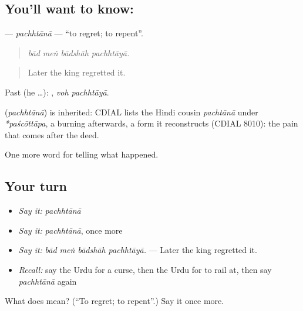 \subsection*{You'll want to know: }
\textbf{} — \emph{pachhtānā} — \textquotedblleft{}to regret; to repent\textquotedblright{}.

\begin{quote}
   
\end{quote}

\begin{quote}
\emph{bād meṅ bādshāh pachhtāyā.}
\end{quote}

\begin{quote}
Later the king regretted it.
\end{quote}

Past (he …):  , \emph{voh pachhtāyā}.

\begin{cousinweb}
\textbf{} (\emph{pachhtānā}) is inherited: CDIAL lists the Hindi cousin \emph{pachtānā} under \emph{*paścōttāpa}, a burning afterwards, a form it reconstructs (CDIAL 8010): the pain that comes after the deed.
\end{cousinweb}

\begin{grammarlens}[title={What you've built}]
One more word for telling what happened.
\end{grammarlens}

\subsection*{Your turn}
\begin{itemize}
\raggedright
  \item \emph{Say it:} \emph{pachhtānā}
  \item \emph{Say it:} \emph{pachhtānā}, once more
  \item \emph{Say it:} \emph{bād meṅ bādshāh pachhtāyā.} — Later the king regretted it.
  \item \emph{Recall:} say the Urdu for a curse, then the Urdu for to rail at, then say \emph{pachhtānā} again
\end{itemize}

\begin{tcolorbox}[breakable,colback=teal!4,colframe=teal!35!black,title={Before you move on}]
What does  mean? (\textquotedblleft{}To regret; to repent\textquotedblright{}.) Say it once more.
\end{tcolorbox}
